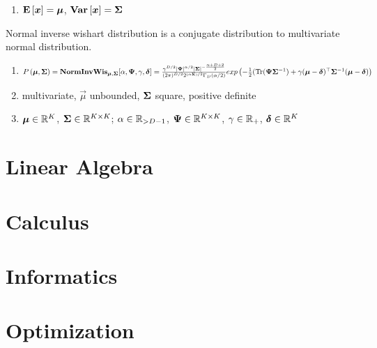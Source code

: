 \begin{description}[leftmargin=0cm]
\begin{enumerate}
		\item $\mathbf{E}\left[\boldsymbol{x}\right]=\boldsymbol{\mu}$, $\mathbf{Var}\left[\boldsymbol{x}\right]=\mathbf{\Sigma}$
	\end{enumerate}
\item[Normal Inverse Wishart] Normal inverse wishart distribution is a conjugate distribution to multivariate normal distribution.
	\begin{enumerate}
		\item $\P{\vec{\mu},\cov}=\NIW_{\vec{\mu},\cov}[\al,\vec{\Ps},\ga,\vec{\de}] \\ =\frac{\ga^{D/2}\det{\vec{\Ps}}^{\al/2}\det{\cov}^{-\frac{\al+D+2}{2}}}{(2\pi)^{D/2}2^{(\al\cov)/2}\Ga_D(\al/2)}\e{-\frac{1}{2}(\Tr(\vec{\Ps}\cov\inv)+\ga(\vec{\mu}-\vec{\de})\T\cov\inv(\vec{\mu}-\vec{\de})}$
		\item multivariate, $\vec{\mu}$ unbounded, $\mathbf{\Sigma}$ square, positive definite
		\item $\boldsymbol{\mu} \in \mathbb{R}^K$, $\mathbf{\Sigma} \in \mathbb{R}^{K \times K}$; $\alpha \in \mathbb{R}_{>D-1}$, $\boldsymbol{\Psi} \in \mathbb{R}^{K \times K}$, $\gamma \in \mathbb{R}_+$, $\boldsymbol{\delta} \in \mathbb{R}^K$
	\end{enumerate}
\end{description}

\section{Linear Algebra}
\label{section2.2}

\section{Calculus}
\label{section2.3}

\section{Informatics}
\label{section2.4}

\section{Optimization}
\label{section2.5}